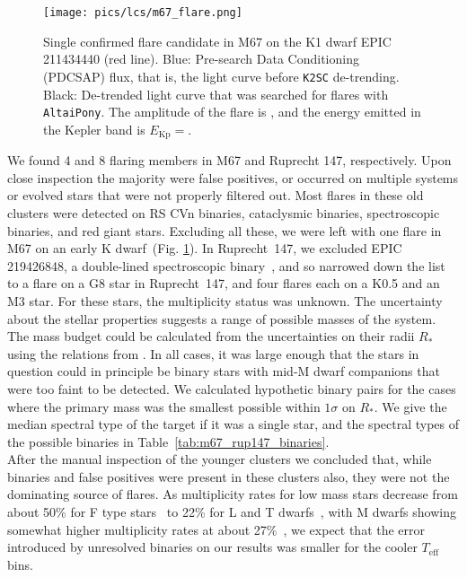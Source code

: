 \documentclass{aa}
\begin{document}
\begin{figure}[ht!]
    \centering
    \texttt{[image: pics/lcs/m67\_flare.png]}
    \caption{Single confirmed flare candidate in M67 on the K1 dwarf EPIC 211434440 (red line). Blue: Pre-search Data Conditioning (PDCSAP) flux, that is, the light curve before \texttt{K2SC} de-trending. Black: De-trended light curve that was searched for flares with \texttt{AltaiPony}. The amplitude of the flare is \unskip, and the energy emitted in the Kepler band is $E_\mathrm{Kp}=$.}      
    \label{fig:m67}
\end{figure}
We found 4 and 8 flaring members in M67 and Ruprecht 147, respectively. Upon close inspection the majority were false positives, or occurred on multiple systems or evolved stars that were not properly filtered out. Most flares in these old clusters were detected on RS CVn binaries, cataclysmic binaries, spectroscopic binaries, and red giant stars. Excluding all these, we were left with one flare in M67 on an early K dwarf~(Fig. \ref{fig:m67}). In Ruprecht~147, we excluded EPIC 219426848, a double-lined spectroscopic binary~\citep{curtis2013}, and so narrowed down the list to a flare on a G8 star in Ruprecht~147, and four flares each on a K0.5 and an M3 star. For these stars, the multiplicity status was unknown. The uncertainty about the stellar properties suggests a range of possible masses of the system. The mass budget could be calculated from the uncertainties on their radii $R_*$ using the relations from \citet{eker2018}. In all cases, it was large enough that the stars in question could in principle be binary stars with mid-M dwarf companions that were too faint to be detected. We calculated hypothetic binary pairs for the cases where the primary mass was the smallest possible within $1\sigma$ on $R_*$. We give the median spectral type of the target if it was a single star, and the spectral types of the possible binaries in Table~\ref{tab:m67_rup147_binaries}.
\\
After the manual inspection of the younger clusters we concluded that, while binaries and false positives were present in these clusters also, they were not the dominating source of flares. As multiplicity rates for low mass stars decrease from about 50\% for F type stars~\citep{raghavan2010} to 22\% for L and T dwarfs~\citep{duchene2013}, with M dwarfs showing somewhat higher multiplicity rates at about 27\%~\citep{winters2019}, we expect that the error introduced by unresolved binaries on our results was smaller for the cooler $T_\mathrm{eff}$ bins.
\end{document}
